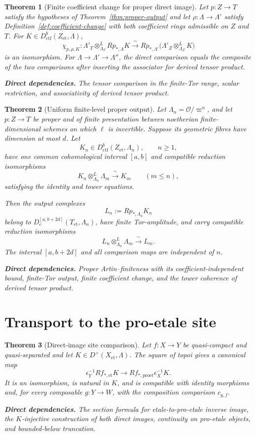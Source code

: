 \documentclass[10pt]{article}
\newtheorem{theorem}{Theorem}[section]
\theoremstyle{definition}
\newcommand{\Dctf}{D^b_{\mathrm{ctf}}}
\newcommand{\deps}[1]{\par\smallskip\noindent\textbf{Direct dependencies.} #1}
\begin{document}
\begin{theorem}[Finite coefficient change for proper direct image]
\label{thm:coefficient-change}
Let $p:Z\to T$ satisfy the hypotheses of Theorem~\ref{thm:proper-output} and
let $\rho:\Lambda\to\Lambda'$ satisfy
Definition~\ref{def:coefficient-change} with both coefficient rings
admissible on $Z$ and $T$.  For $K\in\Dctf(Z_{\mathrm{et}},\Lambda)$,
\[
 \chi_{p,\rho,K}:
 \Lambda'_T\otimes^L_{\Lambda_T}Rp_{*,\Lambda}K
 \xrightarrow{\ \sim\ }
 Rp_{*,\Lambda'}
   \bigl(\Lambda'_Z\otimes^L_{\Lambda_Z}K\bigr)
\]
is an isomorphism.  For
$\Lambda\to\Lambda'\to\Lambda''$, the direct comparison equals the
composite of the two comparisons after inserting the associator for derived
tensor product.
\deps{The tensor comparison in the finite-Tor range, scalar restriction, and
associativity of derived tensor product.}
\end{theorem}

\begin{theorem}[Uniform finite-level proper output]
\label{thm:uniform-level}
Let $\Lambda_n=\mathcal O/\varpi^n$, and let $p:Z\to T$ be proper and of
finite presentation between noetherian finite-dimensional schemes on which
$\ell$ is invertible.  Suppose its geometric fibres have dimension at most
$d$.
Let
\[
 K_n\in\Dctf(Z_{\mathrm{et}},\Lambda_n),\qquad n\geq1,
\]
have one common cohomological interval $[a,b]$ and compatible reduction
isomorphisms
\[
 K_n\otimes^L_{\Lambda_n}\Lambda_m
 \xrightarrow{\ \sim\ }K_m
 \qquad(m\leq n),
\]
satisfying the identity and tower equations.

Then the output complexes
\[
 L_n:=Rp_{*,\Lambda_n}K_n
\]
belong to $D_c^{[a,b+2d]}(T_{\mathrm{et}},\Lambda_n)$, have finite
Tor-amplitude, and carry compatible reduction isomorphisms
\[
 L_n\otimes^L_{\Lambda_n}\Lambda_m
 \xrightarrow{\ \sim\ }L_m.
\]
The interval $[a,b+2d]$ and all comparison maps are independent of $n$.
\deps{Proper Artin--finiteness with its coefficient-independent bound,
finite-Tor output, finite coefficient change, and the tower coherence of
derived tensor product.}
\end{theorem}

\section{Transport to the pro-etale site}

\begin{theorem}[Direct-image site comparison]
\label{thm:site-rf}
Let $f:X\to Y$ be quasi-compact and quasi-separated and let
$K\in D^+(X_{\mathrm{et}},\Lambda)$.  The square of topoi gives a canonical
map
\[
 \epsilon_Y^{-1}Rf_{*,\mathrm{et}}K
 \longrightarrow
 Rf_{*,\mathrm{proet}}\epsilon_X^{-1}K.
\]
It is an isomorphism, is natural in $K$, and is compatible with identity
morphisms and, for every composable $g:Y\to W$, with the composition
comparison $c_{g,f}$.
\deps{The section formula for etale-to-pro-etale inverse image, the
$K$-injective construction of both direct images, continuity on pro-etale
objects, and bounded-below truncation.}
\end{theorem}
\end{document}

